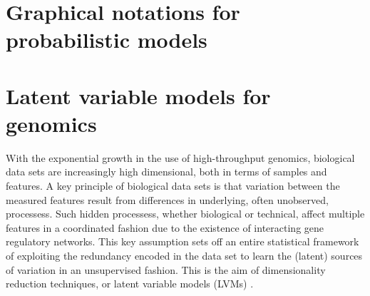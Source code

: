  \section{Graphical notations for probabilistic models}


\section{Latent variable models for genomics}
With the exponential growth in the use of high-throughput genomics, biological data sets are increasingly high dimensional, both in terms of samples and features. A key principle of biological data sets is that variation between the measured features result from differences in underlying, often unobserved, processess. Such hidden processess, whether biological or technical, affect multiple features in a coordinated fashion due to the existence of interacting gene regulatory networks. This key assumption sets off an entire statistical framework of exploiting the redundancy encoded in the data set to learn the (latent) sources of variation in an unsupervised fashion. This is the aim of dimensionality reduction techniques, or latent variable models (LVMs) \cite{Komili2008, Leek2007, Pournara2007, Dai2017, Genevieve2018, Meng2016}.

